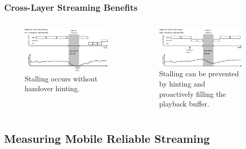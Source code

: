 \documentclass{beamer}
\begin{document}
\begin{frame}
	\frametitle{Cross-Layer Streaming Benefits}

	\begin{columns}[T]
		\begin{figure}
			\includegraphics[width=\columnwidth]{../../chapters/05-mobilestreaming/images/adaptive-streaming-no-cl.pdf}
			\caption{Stalling occurs without handover hinting.}
		\end{figure}

		\begin{figure}
			\includegraphics[width=\columnwidth]{../../chapters/05-mobilestreaming/images/adaptive-streaming-cl.pdf}
			\caption{Stalling can be prevented by hinting and proactively filling the playback buffer.}
		\end{figure}
	\end{columns}
\end{frame}



\subsection{Measuring Mobile Reliable Streaming}
\end{document}
